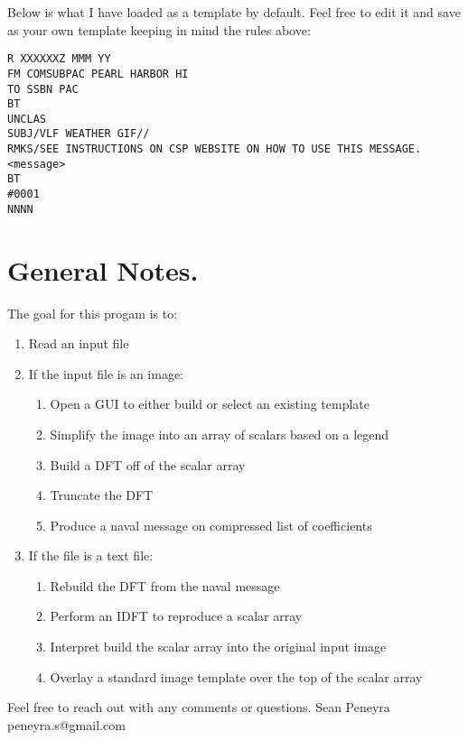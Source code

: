 \begin{addnote} Below is what I have loaded as a template by default. Feel free to edit it and save as your own template keeping in mind the rules above:\end{addnote}
\begin{lstlisting}[numbers=none,rulecolor=\color{black}]
R XXXXXXZ MMM YY
FM COMSUBPAC PEARL HARBOR HI
TO SSBN PAC
BT
UNCLAS
SUBJ/VLF WEATHER GIF//
RMKS/SEE INSTRUCTIONS ON CSP WEBSITE ON HOW TO USE THIS MESSAGE.
<message>
BT
#0001
NNNN
\end{lstlisting}

\section{General Notes.}
 The goal for this progam is to:
 \begin{enumerate}
    \item Read an input file
    \item If the input file is an image:
    \begin{enumerate}
        \item Open a GUI to either build or select an existing template
        \item Simplify the image into an array of scalars based on a legend
        \item Build a DFT off of the scalar array
        \item Truncate the DFT
        \item Produce a naval message on compressed list of coefficients
    \end{enumerate}
    \item If the file is a text file:
    \begin{enumerate}
        \item Rebuild the DFT from the naval message
        \item Perform an IDFT to reproduce a scalar array
        \item Interpret build the scalar array into the original input image
        \item Overlay a standard image template over the top of the scalar array
    \end{enumerate}
\end{enumerate}

     Feel free to reach out with any comments or questions.
     Sean Peneyra
     peneyra.s@gmail.com


